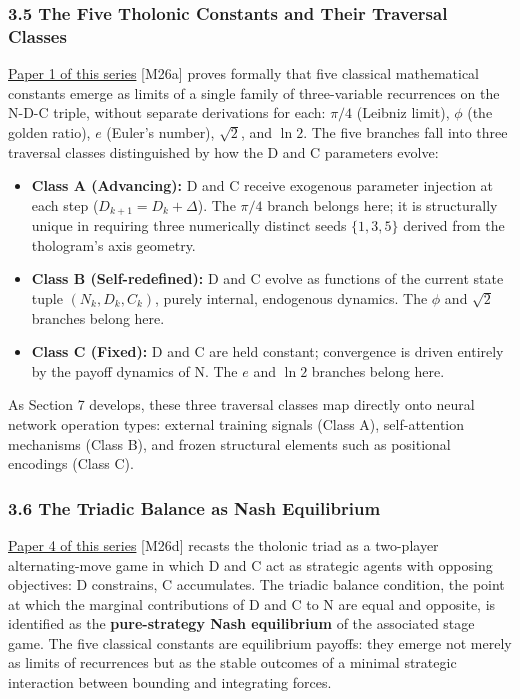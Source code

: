 \documentclass[
  11pt,
  letterpaper,
]{article}
\providecommand{\tightlist}{%
  \setlength{\itemsep}{0pt}\setlength{\parskip}{0pt}}
\begin{document}
\subsubsection{3.5 The Five Tholonic Constants and Their Traversal
Classes}\label{the-five-tholonic-constants-and-their-traversal-classes}

\href{https://github.com/baardev/truevalue/blob/main/docnav/Research/papers/1_recursive-tholonic-five-constants/1_recursive-tholonic-five-constants.pdf}{Paper
1 of this series} {[}M26a{]} proves formally that five classical
mathematical constants emerge as limits of a single family of
three-variable recurrences on the N-D-C triple, without separate
derivations for each: \(\pi/4\) (Leibniz limit), \(\phi\) (the golden
ratio), \(e\) (Euler's number), \(\sqrt{2}\), and \(\ln 2\). The five
branches fall into three traversal classes distinguished by how the D
and C parameters evolve:

\begin{itemize}
\tightlist
\item
  \textbf{Class A (Advancing):} D and C receive exogenous parameter
  injection at each step (\(D_{k+1} = D_k + \Delta\)). The \(\pi/4\)
  branch belongs here; it is structurally unique in requiring three
  numerically distinct seeds \(\{1, 3, 5\}\) derived from the
  thologram's axis geometry.
\item
  \textbf{Class B (Self-redefined):} D and C evolve as functions of the
  current state tuple \((N_k, D_k, C_k)\), purely internal, endogenous
  dynamics. The \(\phi\) and \(\sqrt{2}\) branches belong here.
\item
  \textbf{Class C (Fixed):} D and C are held constant; convergence is
  driven entirely by the payoff dynamics of N. The \(e\) and \(\ln 2\)
  branches belong here.
\end{itemize}

As Section 7 develops, these three traversal classes map directly onto
neural network operation types: external training signals (Class A),
self-attention mechanisms (Class B), and frozen structural elements such
as positional encodings (Class C).

\subsubsection{3.6 The Triadic Balance as Nash
Equilibrium}\label{the-triadic-balance-as-nash-equilibrium}

\href{https://github.com/baardev/truevalue/blob/main/docnav/Research/papers/4_game-theoretic-triadic-balance/4_game-theoretic-triadic-balance.pdf}{Paper
4 of this series} {[}M26d{]} recasts the tholonic triad as a two-player
alternating-move game in which D and C act as strategic agents with
opposing objectives: D constrains, C accumulates. The triadic balance
condition, the point at which the marginal contributions of D and C to N
are equal and opposite, is identified as the \textbf{pure-strategy Nash
equilibrium} of the associated stage game. The five classical constants
are equilibrium payoffs: they emerge not merely as limits of recurrences
but as the stable outcomes of a minimal strategic interaction between
bounding and integrating forces.
\end{document}
